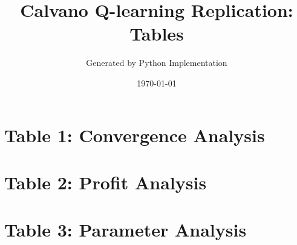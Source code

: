 \documentclass[a4paper,10pt]{article}
\title{Calvano Q-learning Replication: Tables}
\author{Generated by Python Implementation}
\date{\today}
\begin{document}
\maketitle

\section{Table 1: Convergence Analysis}


\section{Table 2: Profit Analysis}


\section{Table 3: Parameter Analysis}

\end{document}
